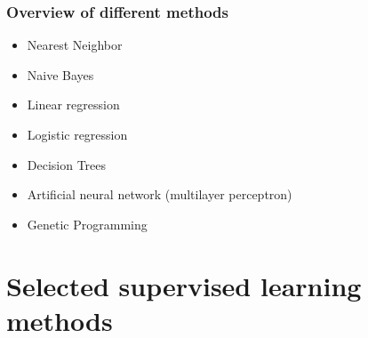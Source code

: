 \documentclass[aspectratio=169]{beamer}
\begin{document}



  


\begin{frame}
  \frametitle{Overview of different methods}
  \begin{block}{}
    \begin{center}
      \begin{itemize}
      \item Nearest Neighbor
      \item Naive Bayes
      \item Linear regression
      \item Logistic regression
      \item Decision Trees
      \item Artificial neural network (multilayer perceptron)
      \item Genetic Programming
      \end{itemize}
    \end{center}    
  \end{block}
\end{frame}




\section{Selected supervised learning methods}
\end{document}
